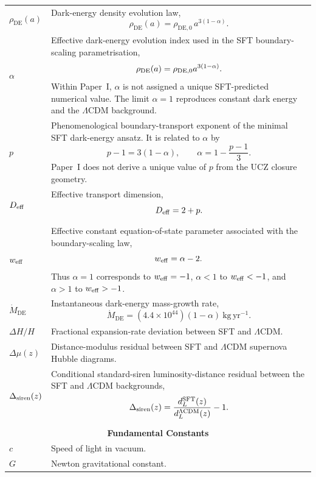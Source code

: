 \documentclass[12pt]{article}
\begin{document}
\begin{longtable}{p{}p{}}
$\rho_{\mathrm{DE}}(a)$ & Dark-energy density evolution law,
\[
\rho_{\mathrm{DE}}(a)
=
\rho_{\mathrm{DE},0}\,a^{3(1-\alpha)}.
\]\\

$\alpha$ & Effective dark-energy evolution index used in the SFT
boundary-scaling parametrisation,
\[
\rho_{\rm DE}(a)
=
\rho_{{\rm DE},0}a^{3(1-\alpha)}.
\]
Within Paper~I, $\alpha$ is not assigned a unique SFT-predicted numerical
value. The limit $\alpha=1$ reproduces constant dark energy and the
$\Lambda$CDM background.\\

$p$ & Phenomenological boundary-transport exponent of the minimal SFT
dark-energy ansatz. It is related to $\alpha$ by
\[
p-1=3(1-\alpha),
\qquad
\alpha=1-\frac{p-1}{3}.
\]
Paper~I does not derive a unique value of $p$ from the UCZ closure
geometry.\\

$D_{\rm eff}$ & Effective transport dimension,
\[
D_{\rm eff}=2+p.
\]\\

$w_{\rm eff}$ & Effective constant equation-of-state parameter
associated with the boundary-scaling law,
\[
w_{\rm eff}
=
\alpha-2.
\]
Thus $\alpha=1$ corresponds to $w_{\rm eff}=-1$,
$\alpha<1$ to $w_{\rm eff}<-1$, and $\alpha>1$ to
$w_{\rm eff}>-1$.\\

$\dot{M}_{\mathrm{DE}}$ & Instantaneous dark-energy mass-growth rate,
\[
\dot{M}_{\mathrm{DE}}
=
(4.4\times10^{44})(1-\alpha)
~\mathrm{kg\,yr^{-1}}.
\]\\

$\Delta H/H$ & Fractional expansion-rate deviation between SFT and $\Lambda$CDM.\\

$\Delta\mu(z)$ & Distance-modulus residual between SFT and $\Lambda$CDM supernova Hubble diagrams.\\

$\Delta_{\rm siren}(z)$ & Conditional standard-siren luminosity-distance
residual between the SFT and $\Lambda$CDM backgrounds,
\[
\Delta_{\rm siren}(z)
=
\frac{d_L^{\rm SFT}(z)}
     {d_L^{\Lambda{\rm CDM}}(z)}
-1.
\]\\


\multicolumn{2}{c}{\textbf{Fundamental Constants}}\\
\hline

$c$ & Speed of light in vacuum.\\

$G$ & Newton gravitational constant.\\

\hline
\end{longtable}
\end{document}
